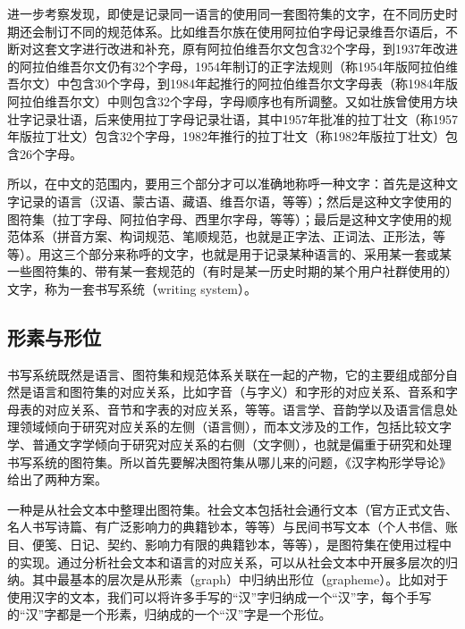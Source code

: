 \documentclass{brochure}
\begin{document}
进一步考察发现，即使是记录同一语言的使用同一套图符集的文字，在不同历史时期还会制订不同的规范体系。比如维吾尔族在使用阿拉伯字母记录维吾尔语后，不断对这套文字进行改进和补充，原有阿拉伯维吾尔文包含32个字母，到1937年改进的阿拉伯维吾尔文仍有32个字母，1954年制订的正字法规则（称1954年版阿拉伯维吾尔文）中包含30个字母，到1984年起推行的阿拉伯维吾尔文字母表（称1984年版阿拉伯维吾尔文）中则包含32个字母，字母顺序也有所调整。又如壮族曾使用方块壮字记录壮语，后来使用拉丁字母记录壮语，其中1957年批准的拉丁壮文（称1957年版拉丁壮文）包含32个字母，1982年推行的拉丁壮文（称1982年版拉丁壮文）包含26个字母。

所以，在中文的范围内，要用三个部分才可以准确地称呼一种文字：首先是这种文字记录的语言（汉语、蒙古语、藏语、维吾尔语，等等）；然后是这种文字使用的图符集（拉丁字母、阿拉伯字母、西里尔字母，等等）；最后是这种文字使用的规范体系（拼音方案、构词规范、笔顺规范，也就是正字法、正词法、正形法，等等）。用这三个部分来称呼的文字，也就是用于记录某种语言的、采用某一套或某一些图符集的、带有某一套规范的（有时是某一历史时期的某个用户社群使用的）文字，称为一套书写系统（writing system）。

\subsection{形素与形位}

书写系统既然是语言、图符集和规范体系关联在一起的产物，它的主要组成部分自然是语言和图符集的对应关系，比如字音（与字义）和字形的对应关系、音系和字母表的对应关系、音节和字表的对应关系，等等。语言学、音韵学以及语言信息处理领域倾向于研究对应关系的左侧（语言侧），而本文涉及的工作，包括比较文字学、普通文字学倾向于研究对应关系的右侧（文字侧），也就是偏重于研究和处理书写系统的图符集。所以首先要解决图符集从哪儿来的问题，《汉字构形学导论》给出了两种方案。

一种是从社会文本中整理出图符集。社会文本包括社会通行文本（官方正式文告、名人书写诗篇、有广泛影响力的典籍钞本，等等）与民间书写文本（个人书信、账目、便笺、日记、契约、影响力有限的典籍钞本，等等），是图符集在使用过程中的实现。通过分析社会文本和语言的对应关系，可以从社会文本中开展多层次的归纳。其中最基本的层次是从形素（graph）中归纳出形位（grapheme）。比如对于使用汉字的文本，我们可以将许多手写的“汉”字归纳成一个“汉”字，每个手写的“汉”字都是一个形素，归纳成的一个“汉”字是一个形位。
\end{document}
